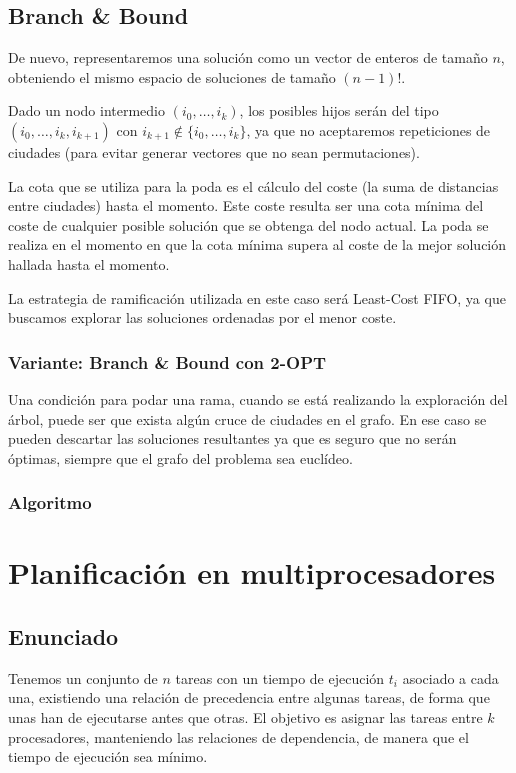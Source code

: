 \documentclass[a4paper, 11pt]{article} %
\begin{document}
    
    \small
    \texttt{}
    \normalsize
    
    \subsection{Branch \& Bound}
      De nuevo, representaremos una solución como un vector de enteros de tamaño $n$, obteniendo el mismo espacio de soluciones de tamaño $(n-1)!$.
      
      Dado un nodo intermedio $(i_0, \dots, i_k)$, los posibles hijos serán del tipo\\ $(i_0, \dots, i_k, i_{k+1})$ con $i_{k+1} \notin \{i_0, \dots, i_k\}$, 
      ya que no aceptaremos repeticiones de ciudades (para evitar generar vectores que no sean permutaciones).
      
      La cota que se utiliza para la poda es el cálculo del coste (la suma de distancias entre ciudades) hasta el momento. Este coste resulta ser una cota 
      mínima del coste de cualquier posible solución que se obtenga del nodo actual.
      La poda se realiza en el momento en que la cota mínima supera al coste de la mejor solución hallada hasta el momento.
      
      La estrategia de ramificación utilizada en este caso será Least-Cost FIFO, ya que buscamos explorar las soluciones ordenadas por el menor coste.
      
      \subsubsection{Variante: Branch \& Bound con 2-OPT}
	Una condición para podar una rama, cuando se está realizando la exploración del árbol, puede ser que exista algún cruce de ciudades en el grafo. 
	En ese caso se pueden descartar las soluciones resultantes ya que es seguro que no serán óptimas, siempre que el grafo del problema sea euclídeo.
    
    \subsubsection{Algoritmo}
    
    \small
    \texttt{}
    \normalsize
    
    \section{Planificación en multiprocesadores}
    \subsection{Enunciado}
    Tenemos un conjunto de $n$ tareas con un tiempo de ejecución $t_i$ asociado a cada una, existiendo una 
    relación de precedencia entre algunas tareas, de forma que unas han de ejecutarse antes que otras. 
    El objetivo es asignar las tareas entre $k$ procesadores, manteniendo las relaciones de dependencia,
    de manera que el tiempo de ejecución sea mínimo. 
    
\end{document}
